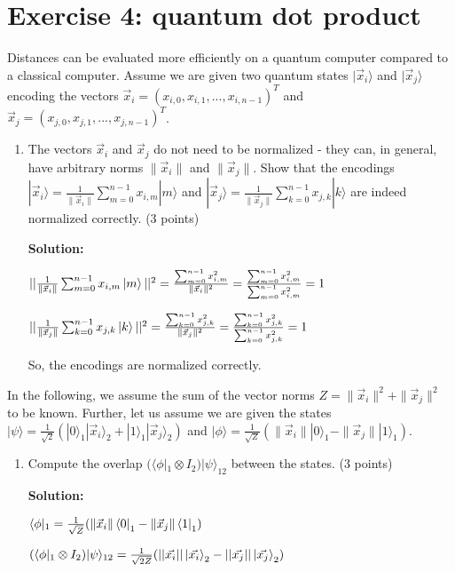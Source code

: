 \documentclass[12pt]{article}
\begin{document}
\section{Exercise 4: quantum dot product}

Distances can be evaluated more efficiently on a quantum computer compared to a classical computer. Assume we are given two quantum states $|\vec{x}_i\rangle$ and $|\vec{x}_j\rangle$ encoding the vectors $\vec{x}_i = (x_{i,0}, x_{i,1}, ..., x_{i,n-1})^T$ and $\vec{x}_j = (x_{j,0}, x_{j,1}, ..., x_{j,n-1})^T$.
\begin{enumerate}
    \item The vectors $\vec{x}_i$ and $\vec{x}_j$ do not need to be normalized - they can, in general, have arbitrary norms $\|\vec{x}_i\|$ and $\|\vec{x}_j\|$. Show that the encodings 
    $|\vec{x}_i\rangle = \frac{1}{\|\vec{x}_i\|} \sum_{m=0}^{n-1} x_{i,m}|m\rangle$ 
    and $|\vec{x}_j\rangle = \frac{1}{\|\vec{x}_j\|} \sum_{k=0}^{n-1} x_{j,k}|k\rangle$ are indeed normalized correctly. (3 points)
    
    \textbf{Solution:}

    $||\frac{1}{\|\vec{x}_i\|} \sum_{m=0}^{n-1} x_{i,m}\ket{m}||^2=
    \frac{\sum_{m=0}^{n-1}x_{i,m}^2}{\|\vec{x}_i\|^2}=
    \frac{\sum_{m=0}^{n-1}x_{i,m}^2}{\sum_{m=0}^{n-1}x_{i,m}^2}=1
    $ 

    $||\frac{1}{\|\vec{x}_j\|} \sum_{k=0}^{n-1} x_{j,k}\ket{k}||^2=
    \frac{\sum_{k=0}^{n-1}x_{j,k}^2}{\|\vec{x}_j\|^2}=
    \frac{\sum_{k=0}^{n-1}x_{j,k}^2}{\sum_{k=0}^{n-1}x_{j,k}^2}=1
    $ 

    So, the encodings are normalized correctly.
\end{enumerate}


In the following, we assume the sum of the vector norms $Z = \|\vec{x}_i\|^2 + \|\vec{x}_j\|^2$ to be known. Further, let us assume we are given the states $|\psi\rangle = \frac{1}{\sqrt{2}}(|0\rangle_1|\vec{x}_i\rangle_2 + |1\rangle_1|\vec{x}_j\rangle_2)$ and $|\phi\rangle = \frac{1}{\sqrt{Z}}(\|\vec{x}_i\||0\rangle_1 - \|\vec{x}_j\||1\rangle_1)$.

\begin{enumerate}[start=2]
    \item Compute the overlap $(\langle\phi|_1 \otimes I_2)|\psi\rangle_{12}$ between the states. (3 points)
    

    \textbf{Solution:}

    $\langle\phi|_1=\frac{1}{\sqrt{Z}}(\|\vec{x}_i\|\bra{0}_1 - \|\vec{x}_j\|\bra{1}_1)$
    
    $(\langle\phi|_1 \otimes I_2)|\psi\rangle_{12}
    \\=\frac{1}{\sqrt{2Z}}(||\vec{x_i}||\ket{\vec{x_i}}_2-||\vec{x_j}||\ket{\vec{x_j}}_2)$

\end{enumerate}
\end{document}

